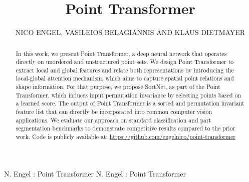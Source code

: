 \documentclass{ieeeaccess}
\begin{document}

\title{Point Transformer}
\author{\uppercase{Nico Engel},
\uppercase{Vasileios Belagiannis and Klaus Dietmayer}}
\address[1]{Institute of Measurement, Control and Microtechnology, Ulm University, Albert-Einstein-Allee 41, 89081 Ulm, Germany (e-mail: firstname.lastname@uni-ulm.de)}


\markboth
{N. Engel \headeretal: Point Transformer}
{N. Engel \headeretal: Point Transformer}






\newcommand\copyrighttext{\scriptsize \copyright~2021 IEEE. Personal use of this material is permitted. Permission from IEEE must be obtained for all other uses, in any current or future media, including reprinting/republishing this material for advertising or promotional purposes, creating new collective works, for resale or redistribution to servers or lists, or reuse of any copyrighted component of this work in other works.}\newcommand\copyrightnotice{\begin{tikzpicture}[remember picture,overlay]
\node[anchor=south,yshift=18pt,xshift=0.25cm,scale=0.8] at (current page.south) {{\parbox{\dimexpr\textwidth-\fboxsep-\fboxrule\relax}{\copyrighttext}}};
\end{tikzpicture}}

\begin{abstract}
In this work, we present Point Transformer, a deep neural network that operates directly on unordered and unstructured point sets. We design Point Transformer to extract local and global features and relate both representations by introducing the local-global attention mechanism, which aims to capture spatial point relations and shape information. For that purpose, we propose SortNet, as part of the Point Transformer, which induces input permutation invariance by selecting points based on a learned score. The output of Point Transformer is a sorted and permutation invariant feature list that can directly be incorporated into common computer vision applications. We evaluate our approach on standard classification and part segmentation benchmarks to demonstrate competitive results compared to the prior work. Code is publicly available at: \url{https://github.com/engelnico/point-transformer}
\end{abstract}
\end{document}
